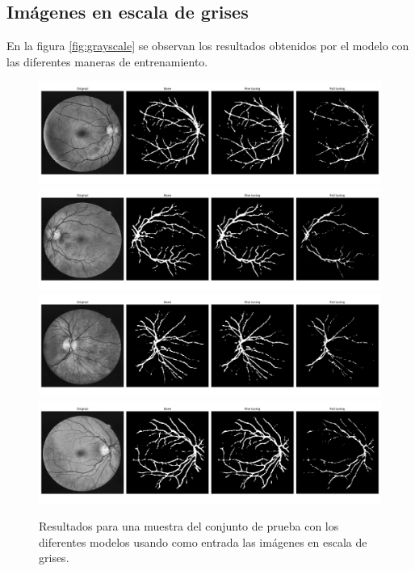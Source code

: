 \subsection{Imágenes en escala de grises}

En la figura \ref{fig:grayscale} se observan los resultados obtenidos por el modelo con las diferentes maneras de entrenamiento.

\begin{figure}[H]
    \centering
    \includegraphics[width=14cm]{Graphics/grayscale/04.png}
    \includegraphics[width=14cm]{Graphics/grayscale/06.png}
    \includegraphics[width=14cm]{Graphics/grayscale/10.png}
    \includegraphics[width=14cm]{Graphics/grayscale/14.png}
    \caption{Resultados para una muestra del conjunto de prueba con los diferentes modelos usando como entrada las imágenes en escala de grises.}
    \label{fig:grayscale_results}
\end{figure}
